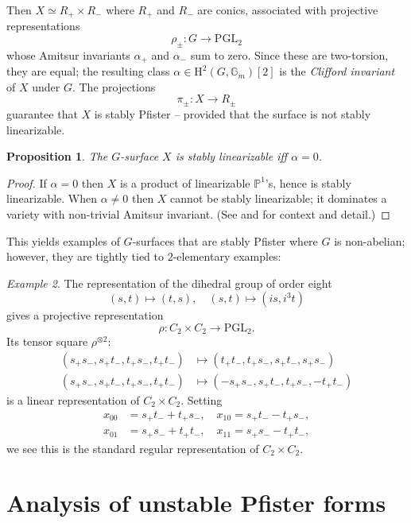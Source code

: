 \documentclass[12pt]{amsart}
\numberwithin{equation}{section}
\newcommand{\ra}{\rightarrow}
\newcommand{\bG}{\mathbb{G}}
\newcommand{\bP}{\mathbb{P}}
\newcommand{\rH}{\mathrm{H}}
\newcommand{\PGL}{\mathrm{PGL}}
\theoremstyle{plain}
\newtheorem{prop}{Proposition}[section]
\theoremstyle{definition}
\theoremstyle{remark}
\newtheorem{exam}[prop]{Example}
\begin{document}
Then $X\simeq R_+\times R_-$ 
where $R_+$ and $R_-$ are conics, associated with 
projective representations
$$\rho_{\pm}:G \rightarrow \PGL_2$$
whose Amitsur invariants $\alpha_+$ and $\alpha_-$ 
sum to zero. Since these are two-torsion, they are 
equal; the resulting class $\alpha \in \rH^2(G,\bG_m)[2]$
is the {\em Clifford invariant} of $X$ under $G$.
The projections 
$$\pi_{\pm}:X \ra R_{\pm}$$
guarantee that $X$ is stably Pfister --
provided that the surface is not stably linearizable.

\begin{prop} 
The $G$-surface
$X$ is stably linearizable iff $\alpha=0$.
\end{prop}
\begin{proof}

If $\alpha=0$ then $X$ is a product of linearizable $\bP^1$'s,
hence is stably linearizable. 
When $\alpha \neq 0$ then $X$ cannot be 
stably linearizable;
it dominates a variety with non-trivial Amitsur invariant. (See \cite[Prop.~A7]{BCDP} and \cite[\S7]{HTNagoya} for context and detail.)
\end{proof}

This yields examples of $G$-surfaces that are stably Pfister
where $G$ is non-abelian; however, they are tightly
tied to $2$-elementary examples:

\begin{exam}
The representation of the dihedral group of order eight
$$(s,t) \mapsto (t,s), \quad (s,t) \mapsto (is,i^3 t)$$
gives a projective representation 
$$\rho:C_2\times C_2 \rightarrow \PGL_2.$$
Its tensor square $\rho^{\otimes 2}$:
\begin{align*}(s_+s_-,s_+t_-,t_+s_-,t_+t_-) &\mapsto 
(t_+t_-,t_+s_-,s_+t_-,s_+s_-) \\
(s_+s_-,s_+t_-,t_+s_-,t_+t_-) & \mapsto
(-s_+s_-,s_+t_-,t_+s_-,-t_+t_-)
\end{align*}
is a linear representation of $C_2\times C_2$. 
Setting 
\begin{align*}
x_{00}& =s_+t_- + t_+s_-, \quad 
x_{10} =s_+t_- - t_+s_-,\\
x_{01}& =s_+s_- + t_+t_-,\quad 
x_{11} =s_+s_- - t_+t_-,
\end{align*}
we see this is the standard regular representation of $C_2\times C_2$.
\end{exam}


\section{Analysis of unstable Pfister forms}
\label{sect:unstable}
\end{document}
